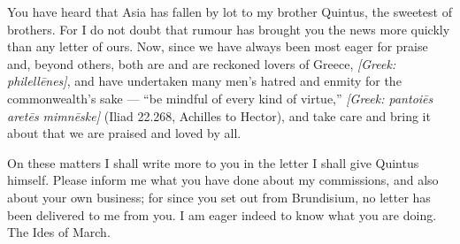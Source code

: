 

 You have heard that Asia has fallen by lot to my brother Quintus, the sweetest of brothers. For I do not doubt that rumour has brought you the news more quickly than any letter of ours. Now, since we have always been most eager for praise and, beyond others, both are and are reckoned lovers of Greece, \textit{[Greek: philell\=enes]}, and have undertaken many men's hatred and enmity for the commonwealth's sake --- ``be mindful of every kind of virtue,'' \textit{[Greek: pantoi\=es aret\=es mimn\=eske]} (Iliad 22.268, Achilles to Hector), and take care and bring it about that we are praised and loved by all.

 On these matters I shall write more to you in the letter I shall give Quintus himself. Please inform me what you have done about my commissions, and also about your own business; for since you set out from Brundisium, no letter has been delivered to me from you. I am eager indeed to know what you are doing. The Ides of March.
